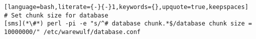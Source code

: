 \begin{lstlisting}[language=bash,literate={-}{-}1,keywords={},upquote=true,keepspaces]
# Set chunk size for database
[sms](*\#*) perl -pi -e "s/^# database chunk.*$/database chunk size = 10000000/" /etc/warewulf/database.conf
\end{lstlisting}
